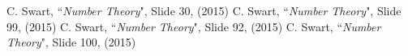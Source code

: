 \begin{thebibliography}{99}
	C. Swart, ``{\it Number Theory}", Slide 30, (2015)
	C. Swart, ``{\it Number Theory}", Slide 99, (2015) 
	C. Swart, ``{\it Number Theory}", Slide 92, (2015)
	C. Swart, ``{\it Number Theory}", Slide 100, (2015)
\end{thebibliography}
